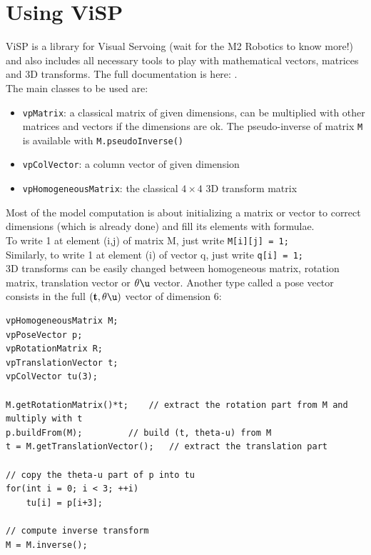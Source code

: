 \documentclass{ecnreport}
\begin{document}
\appendix


\newpage

\section{Using ViSP}\label{visp}

ViSP is a library for Visual Servoing (wait for the M2 Robotics to know more!) and also includes all necessary tools to play with mathematical vectors, matrices and 3D transforms.
The full documentation is here: .\\
The main classes to be used are:
\begin{itemize}
	\item \texttt{vpMatrix}: a classical matrix of given dimensions, can be multiplied with other matrices and vectors if the dimensions are ok. The pseudo-inverse of matrix \texttt{M} 
	is available with \texttt{M.pseudoInverse()}
	\item \texttt{vpColVector}: a column vector of given dimension
	\item \texttt{vpHomogeneousMatrix}: the classical $4\times 4$ 3D transform matrix
\end{itemize}
Most of the model computation is about initializing a matrix or vector to correct dimensions (which is already done) and fill its elements with formulae.\\
To write 1 at element (i,j) of matrix M, just write \texttt{M[i][j] = 1;}\\
Similarly, to write 1 at element (i) of vector q, just write \texttt{q[i] = 1;}\\

3D transforms can be easily changed between homogeneous matrix, rotation matrix, translation vector or $\theta\u$ vector. Another type called a pose vector
consists in the full $(\mathbf{t}, \theta\u)$ vector of dimension 6:
\cppstyle
\begin{lstlisting}
vpHomogeneousMatrix M;
vpPoseVector p;
vpRotationMatrix R;
vpTranslationVector t;
vpColVector tu(3);

M.getRotationMatrix()*t;	// extract the rotation part from M and multiply with t
p.buildFrom(M);			// build (t, theta-u) from M
t = M.getTranslationVector();	// extract the translation part

// copy the theta-u part of p into tu
for(int i = 0; i < 3; ++i)
	tu[i] = p[i+3];
	
// compute inverse transform
M = M.inverse();
\end{lstlisting}
\end{document}
